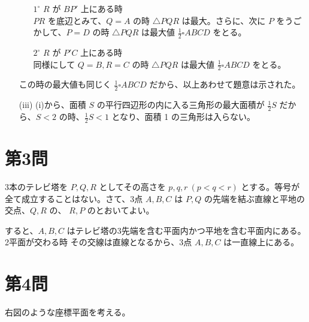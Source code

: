 \documentclass[../main.tex]{subfiles}
\begin{document}
\begin{enumerate}
    \begin{enumerate}
      \item[$1^\circ$] $R$ が $BP'$ 上にある時\\
        $PR$ を底辺とみて、$Q=A$ の時 $\triangle PQR$ は最大。さらに、次に $P$ をうごかして、$P=D$ の時 $\triangle PQR$ は最大値 $\frac{1}{2}\square ABCD$ をとる。

      \item[$2^\circ$] $R$ が $P'C$ 上にある時\\
        同様にして $Q=B, R=C$ の時 $\triangle PQR$ は最大値 $\frac{1}{2}\square ABCD$ をとる。
    \end{enumerate}

    この時の最大値も同じく $\frac{1}{2}\square ABCD$ だから、以上あわせて題意は示された。

  \item[(iii)] (i)から、面積 $S$ の平行四辺形の内に入る三角形の最大面積が $\frac{1}{2}S$ だから、$S < 2$ の時、$\frac{1}{2}S < 1$ となり、面積 1 の三角形は入らない。
\end{enumerate}

\newpage

\section*{第3問}

\noindent
[\textbf{解}] 3本のテレビ塔を $P, Q, R$ としてその高さを $p, q, r\ (p < q < r)$ とする。等号が全て成立することはない。さて、3点 $A, B, C$ は $P, Q$ の先端を結ぶ直線と平地の交点、$Q, R$ の、 $R, P$ のとおいてよい。

すると、$A, B, C$ はテレビ塔の3先端を含む平面内かつ平地を含む平面内にある。2平面が交わる時 その交線は直線となるから、3点 $A, B, C$ は一直線上にある。

\newpage

\section*{第4問}

\noindent
[\textbf{解}] 右図のような座標平面を考える。

\begin{center}
\end{center}
\end{document}
